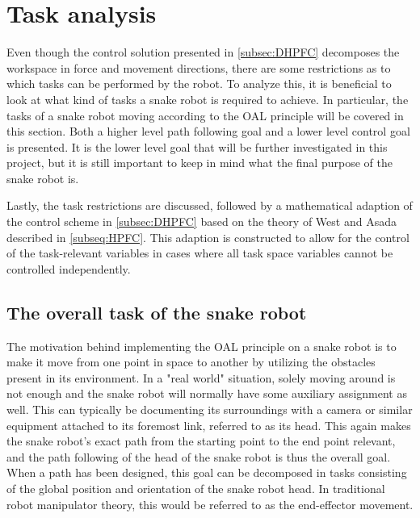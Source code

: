 



\section{Task analysis}

Even though the control solution presented in \ref{subsec:DHPFC} decomposes the workspace in force and movement directions, there are some restrictions as to which tasks can be performed by the robot. To analyze this, it is beneficial to look at what kind of tasks a snake robot is required to achieve. In particular, the tasks of a snake robot moving according to the OAL principle will be covered in this section. Both a higher level path following goal and a lower level control goal is presented. It is the lower level goal that will be further investigated in this project, but it is still important to keep in mind what the final purpose of the snake robot is.

Lastly, the task restrictions are discussed, followed by a mathematical adaption of the control scheme in \ref{subsec:DHPFC} based on the theory of West and Asada \cite{west1985method} described in \ref{subseq:HPFC}. This adaption is constructed to allow for the control of the task-relevant variables in cases where all task space variables cannot be controlled independently.

\subsection{The overall task of the snake robot}

The motivation behind implementing the OAL principle on a snake robot is to make it move from one point in space to another by utilizing the obstacles present in its environment. In a "real world" situation, solely moving around is not enough and the snake robot will normally have some auxiliary assignment as well. This can typically be documenting its surroundings with a camera or similar equipment attached to its foremost link, referred to as its head. This again makes the snake robot's exact path from the starting point to the end point relevant, and the path following of the head of the snake robot is thus the overall goal. When a path has been designed, this goal can be decomposed in tasks consisting of the global position and orientation of the snake robot head. In traditional robot manipulator theory, this would be referred to as the end-effector movement. 


